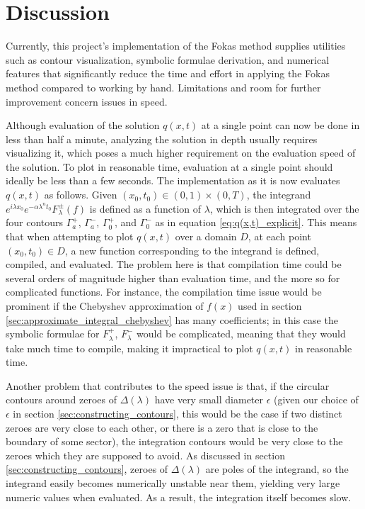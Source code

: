 \documentclass[11pt, oneside, a4paper]{article}
\begin{document}
\section{Discussion}
Currently, this project's implementation of the Fokas method \cite{Xiao} supplies utilities such as contour visualization, symbolic formulae derivation, and numerical features that significantly reduce the time and effort in applying the Fokas method compared to working by hand. Limitations and room for further improvement concern issues in speed. 

Although evaluation of the solution $q(x,t)$ at a single point can now be done in less than half a minute, analyzing the solution in depth usually requires visualizing it, which poses a much higher requirement on the evaluation speed of the solution. To plot in reasonable time, evaluation at a single point should ideally be less than a few seconds. The implementation as it is now evaluates $q(x,t)$ as follows. Given $(x_0, t_0)\in (0,1)\times (0,T)$, the integrand $e^{i\lambda x_0}e^{-\alpha \lambda^n t_0}F_\lambda^\pm(f)$ is defined as a function of $\lambda$, which is then integrated over the four contours $\Gamma_a^+$, $\Gamma_a^-$, $\Gamma_0^+$, and $\Gamma_0^-$ as in equation \eqref{eq:q(x,t)_explicit}. This means that when attempting to plot $q(x,t)$ over a domain $D$, at each point $(x_0, t_0)\in D$, a new function corresponding to the integrand is defined, compiled, and evaluated. The problem here is that compilation time could be several orders of magnitude higher than evaluation time, and the more so for complicated functions. For instance, the compilation time issue would be prominent if the Chebyshev approximation of $f(x)$ used in section \ref{sec:approximate_integral_chebyshev} has many coefficients; in this case the symbolic formulae for $F_\lambda^+$, $F_\lambda^-$ would be complicated, meaning that they would take much time to compile, making it impractical to plot $q(x,t)$ in reasonable time.

Another problem that contributes to the speed issue is that, if the circular contours around zeroes of $\Delta(\lambda)$ have very small diameter $\epsilon$ (given our choice of $\epsilon$ in section \ref{sec:constructing_contours}, this would be the case if two distinct zeroes are very close to each other, or there is a zero that is close to the boundary of some sector), the integration contours would be very close to the zeroes which they are supposed to avoid. As discussed in section \ref{sec:constructing_contours}, zeroes of $\Delta(\lambda)$ are poles of the integrand, so the integrand easily becomes numerically unstable near them, yielding very large numeric values when evaluated. As a result, the integration itself becomes slow.
\end{document}
